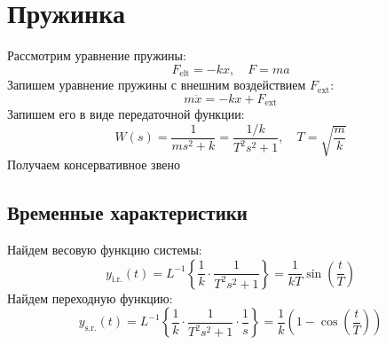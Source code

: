 \section{Пружинка}
Рассмотрим уравнение пружины:
\begin{equation}
    F_{\text{elt}} = -kx, \quad F = ma
\end{equation}
Запишем уравнение пружины с внешним воздействием $F_{\text{ext}}$:
\begin{equation}
    m\ddot{x} = -kx + F_{\text{ext}}
\end{equation}
Запишем его в виде передаточной функции:
\begin{equation}
    W(s) = \frac{1}{ms^2 + k} = \frac{1/k}{T^2s^2 + 1}, \quad T = \sqrt{\frac{m}{k}}
\end{equation}
Получаем консервативное звено
\subsection{Временные характеристики}
\noindent Найдем весовую функцию системы:
\begin{equation}
    y_{\text{i.r.}}(t) = L^{-1}\left\{\frac{1}{k}\cdot\frac{1}{T^2s^2 + 1}\right\} = \frac{1}{kT}\sin\left(\frac{t}{T}\right)
\end{equation}
Найдем переходную функцию:
\begin{equation}
    y_{\text{s.r.}}(t) = L^{-1}\left\{\frac{1}{k}\cdot\frac{1}{T^2s^2 + 1}\cdot\frac{1}{s}\right\} = \frac{1}{k} \left(1 - \cos\left(\frac{t}{T}\right)\right)
\end{equation}

